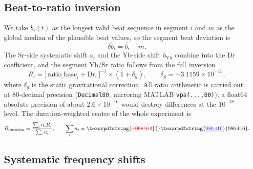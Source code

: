 \documentclass[11pt,a4paper]{article}
\makeatletter
\newcommand{\Rdur}{R_{\mathrm{duration}}}
\newcommand{\e}[1]{\times 10^{#1}}
\providecommand{\DIFaddtex}[1]{{\protect\color{blue}\uwave{#1}}} %
\providecommand{\DIFdeltex}[1]{{\protect\color{red}\sout{#1}}} %
\providecommand{\DIFaddbegin}{} %
\providecommand{\DIFaddend}{} %
\providecommand{\DIFdelbegin}{} %
\providecommand{\DIFdelend}{} %
\providecommand{\DIFadd}[1]{\texorpdfstring{\DIFaddtex{#1}}{#1}} %
\providecommand{\DIFdel}[1]{\texorpdfstring{\DIFdeltex{#1}}{}} %
\providecommand{\DIFscaledelfig}{0.5}
\newlength{\DIFdelgraphicswidth} %
\newlength{\DIFdelgraphicsheight} %
\providecommand{\DIFaddincludegraphics}[2][]{{\color{blue}\fbox{\DIFOincludegraphics[#1]{#2}}}} %
\providecommand{\DIFdelincludegraphics}[2][]{%
\sbox{\DIFdelgraphicsbox}{\DIFOincludegraphics[#1]{#2}}%
\settoboxwidth{\DIFdelgraphicswidth}{\DIFdelgraphicsbox} %
\settoboxtotalheight{\DIFdelgraphicsheight}{\DIFdelgraphicsbox} %
\scalebox{\DIFscaledelfig}{%
\parbox[b]{\DIFdelgraphicswidth}{\usebox{\DIFdelgraphicsbox}\\[-\baselineskip] \rule{\DIFdelgraphicswidth}{0em}}\llap{\resizebox{\DIFdelgraphicswidth}{\DIFdelgraphicsheight}{%
\setlength{\unitlength}{\DIFdelgraphicswidth}%
\begin{picture}(1,1)%
\thicklines\linethickness{2pt} %
{\color[rgb]{1,0,0}\put(0,0){\framebox(1,1){}}}%
{\color[rgb]{1,0,0}\put(0,0){\line( 1,1){1}}}%
{\color[rgb]{1,0,0}\put(0,1){\line(1,-1){1}}}%
\end{picture}%
}\hspace*{3pt}}} %
} %
\DeclareRobustCommand{\DIFaddbegin}{\DIFOaddbegin \let\includegraphics\DIFaddincludegraphics} %
\DeclareRobustCommand{\DIFaddend}{\DIFOaddend \let\includegraphics\DIFOincludegraphics} %
\DeclareRobustCommand{\DIFdelbegin}{\DIFOdelbegin \let\includegraphics\DIFdelincludegraphics} %
\DeclareRobustCommand{\DIFdelend}{\DIFOaddend \let\includegraphics\DIFOincludegraphics} %
\let\sout@orig\sout %
\renewcommand{\sout}[1]{\ifmmode\text{\sout@orig{\ensuremath{#1}}}\else\sout@orig{#1}\fi} %
\makeatother
\begin{document}


\subsection{Beat-to-ratio inversion}
\label{app:methods-ratio}
We take $b_i(t)$ as the longest valid beat sequence in segment $i$ and
$m$ as the global median of the plausible beat values, so the segment beat
deviation is
\begin{equation}
  \overline{\delta b}_i = \overline{b_i} - m .
\end{equation}
The Sr-side systematic shift $a_i$ and the Yb-side shift $b_{\mathrm{Yb}}$
combine into the Dr coefficient, and the segment Yb/Sr ratio follows from
the full inversion
\begin{equation}
  R_i = \bigl[\,\mathrm{ratio\_base}_i + \mathrm{Dr}_i\,\bigr]^{-1}
        \times (1+\delta_g),
  \qquad \delta_g = -3.1159\e{-15},
  \label{eq:ratio}
\end{equation}
where $\delta_g$ is the static gravitational correction. All ratio
arithmetic is carried out at 80-decimal precision (\texttt{Decimal80},
mirroring MATLAB \texttt{vpa(...,80)}); a float64 absolute precision of
about $2.6\e{-16}$ would destroy differences at the $10^{-18}$ level. The
duration-weighted centre of the whole experiment is
\begin{equation}
  \Rdur = \frac{\sum_i n_i R_i}{\sum_i n_i},
  \qquad \sum_i n_i = \DIFdelbegin \DIFdel{\mbox{%
\num{1008912}}\hskip0pt%
}\DIFdelend \DIFaddbegin \DIFadd{\mbox{%
\num{986416}}\hskip0pt%
}\DIFaddend .
  \label{eq:rduration}
\end{equation}


\subsection{Systematic frequency shifts}
\label{app:systematics}
\end{document}

